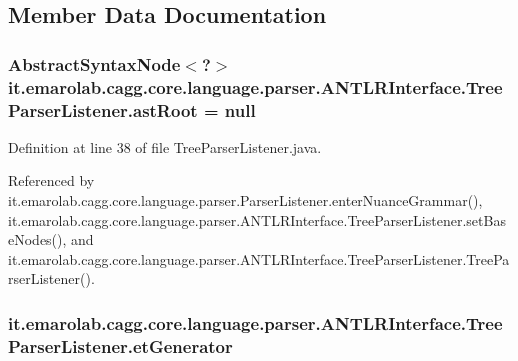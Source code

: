 \subsection{Member Data Documentation}
\hypertarget{classit_1_1emarolab_1_1cagg_1_1core_1_1language_1_1parser_1_1ANTLRInterface_1_1TreeParserListener_ad21c3a5295c708707d5d40758bf3cb47}{
\subsubsection[{ast\-Root}]{\setlength{\rightskip}{0pt plus 5cm}Abstract\-Syntax\-Node$<$?$>$ it.\-emarolab.\-cagg.\-core.\-language.\-parser.\-A\-N\-T\-L\-R\-Interface.\-Tree\-Parser\-Listener.\-ast\-Root = null\hspace{0.3cm}{\ttfamily [private]}}}\label{classit_1_1emarolab_1_1cagg_1_1core_1_1language_1_1parser_1_1ANTLRInterface_1_1TreeParserListener_ad21c3a5295c708707d5d40758bf3cb47}


Definition at line 38 of file Tree\-Parser\-Listener.\-java.



Referenced by it.\-emarolab.\-cagg.\-core.\-language.\-parser.\-Parser\-Listener.\-enter\-Nuance\-Grammar(), it.\-emarolab.\-cagg.\-core.\-language.\-parser.\-A\-N\-T\-L\-R\-Interface.\-Tree\-Parser\-Listener.\-set\-Base\-Nodes(), and it.\-emarolab.\-cagg.\-core.\-language.\-parser.\-A\-N\-T\-L\-R\-Interface.\-Tree\-Parser\-Listener.\-Tree\-Parser\-Listener().

\hypertarget{classit_1_1emarolab_1_1cagg_1_1core_1_1language_1_1parser_1_1ANTLRInterface_1_1TreeParserListener_a70e1c2776e82386a35ccd34ade6071ff}{
\subsubsection[{et\-Generator}]{ it.\-emarolab.\-cagg.\-core.\-language.\-parser.\-A\-N\-T\-L\-R\-Interface.\-Tree\-Parser\-Listener.\-et\-Generator\hspace{0.3cm}{\ttfamily [private]}}}\label{classit_1_1emarolab_1_1cagg_1_1core_1_1language_1_1parser_1_1ANTLRInterface_1_1TreeParserListener_a70e1c2776e82386a35ccd34ade6071ff}



